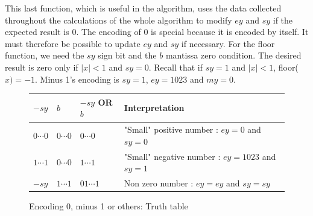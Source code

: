 \documentclass[runningheads]{llncs}
\begin{document}
  This last function, which is useful in the algorithm, uses the data collected throughout the calculations of the whole algorithm to modify $ey$ and $sy$ if the expected result is 0.
    The encoding of $0$ is special because it is encoded by itself. It must therefore be possible to update $ey$ and $sy$ if necessary. 
    For the floor function, we need the $sy$ sign bit and the $b$ mantissa zero condition.
    The desired result is zero only if $\mid x \mid <1$ and $sy=0$. Recall that if $sy=1$ and $\mid x \mid <1$, floor($x)=-1$. 
    Minus 1's encoding is $sy = 1$, $ey = 1023$ and $my = 0$.

    \begin{figure}
      \begin{center}
          \begin{tabular}{C{1.2cm} C{1.2cm} || C{2 cm} C{7.5cm}}
              \hline $-sy$ & $b$ &$-sy$ OR $b$ & Interpretation\\
              \hline 
              $0\cdots0$ & $0\cdots0$ & $0\cdots0$ & "Small" positive number : $ey = 0$ and $sy = 0$  \\
              $1\cdots1$ & $0\cdots0$ & $1\cdots1$ & "Small" negative number : $ey = 1023$ and $sy = 1$\\ 
              $-sy$ & $1\cdots1$ & $01\cdots1$ & Non zero number : $ey = ey$ and $sy=sy$\\\hline
          \end{tabular}
      \end{center}
      \caption{Encoding 0, minus 1 or others: Truth table}
      \label{figure:flooradjust2}
  \end{figure}
%
%
%
 
 
\end{document}
